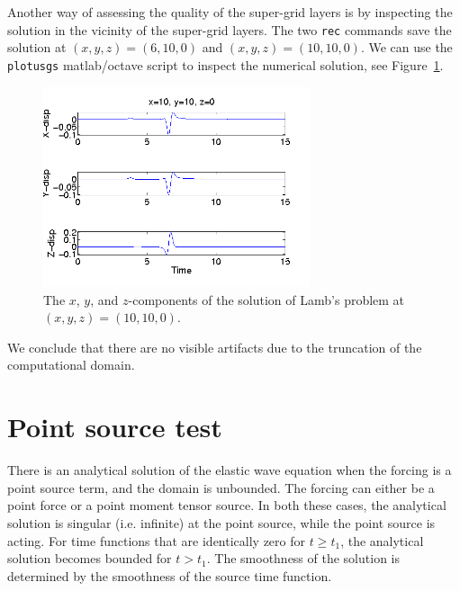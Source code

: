 \documentclass[11pt]{report}
\begin{document}
Another way of assessing the quality of the super-grid layers is by inspecting the solution in the
vicinity of the super-grid layers. The two \verb+rec+ commands save the solution at $(x,y,z)=(6,10,0)$
and $(x,y,z)=(10,10,0)$. We can use the \verb+plotusgs+ matlab/octave script to inspect the
numerical solution, see Figure~\ref{fig:sg2}.
\begin{figure}[ht]
\begin{center}
\includegraphics[width=0.7\textwidth]{figures/sg2.png}
\caption{The $x$, $y$, and $z$-components of the solution of Lamb's problem at $(x,y,z)=(10,10,0)$.}
\label{fig:sg2}
\end{center}
\end{figure}
We conclude that there are no visible artifacts due to the truncation of the computational domain.


\section{Point source test}\label{sec:testpointsource}

There is an analytical solution of the elastic wave equation when the forcing is a point source
term, and the domain is unbounded. The forcing can either be a point force or a point moment tensor
source. In both these cases, the analytical solution is singular (i.e. infinite) at the point source,
while the point source is acting. For time functions that are identically zero for $t\geq t_1$, the
analytical solution becomes bounded for $t>t_1$. The smoothness of the solution is determined by the
smoothness of the source time function.
\end{document}
